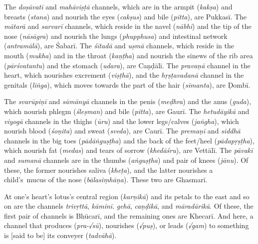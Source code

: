 \documentclass[naipra.tex]{subfiles}
\begin{document}
The \emph{doṣāvatī} and \emph{mahāviṣṭā} channels, which are in the armpit (\emph{kakṣa}) and breasts (\emph{stana}) and nourish the eyes (\emph{cakṣus}) and bile (\emph{pitta}), are Pukkasī.
The \emph{mātarā} and \emph{sarvarī} channels, which reside in the navel (\emph{nābhi}) and the tip of the nose (\emph{nāsāgra}) and nourish the lungs (\emph{phupphusa}) and intestinal network (\emph{antramālā}), are Śabarī.
The \emph{śītadā} and \emph{uṣmā} channels, which reside in the mouth (\emph{mukha}) and in the throat (\emph{kaṇṭha}) and nourish the sinews of the rib area (\emph{pārśvatantu}) and the stomach (\emph{udara}), are Caṇḍālī.
The \emph{pravaṇā} channel in the heart, which nourishes excrement (\emph{viṣṭhā}), and the \emph{hṛṣṭavadanā} channel in the genitals (\emph{liṅga}), which moves towards the part of the hair (\emph{sīmanta}), are Ḍombī.

The \emph{svarūpiṇī} and \emph{sāmānyā} channels in the penis (\emph{meḍhra}) and the anus (\emph{guda}), which nourish phlegm (\emph{śleṣman}) and bile (\emph{pitta}), are Gaurī.
The \emph{hetudāyikā} and \emph{viyogā} channels in the thighs (\emph{ūru}) and the lower legs/calves (\emph{jaṅgha}), which nourish blood (\emph{śoṇita}) and sweat (\emph{sveda}), are Caurī.
The \emph{premaṇī} and \emph{siddhā} channels in the big toes (\emph{pādāṅguṣṭha}) and the back of the feet/heel (\emph{pādapṛṣṭha}), which nourish fat (\emph{medas}) and tears of sorrow (\emph{khedāśru}), are Vettālī.
The \emph{pāvakī} and \emph{sumanā} channels are in the thumbs (\emph{aṅguṣṭha}) and pair of knees (\emph{jānu}).
Of these, the former nourishes saliva (\emph{kheṭa}), and the latter nourishes \crux a child's\crux\ mucus of the nose (\emph{bālasiṃhāṇa}).
These two are Ghasmarī.

At one's heart's lotus's central region (\emph{karṇikā}) and its petals to the east and so on are the channels \emph{trivṛttā}, \emph{kāminī}. \emph{gehā}, \emph{caṇḍikā}, and \emph{māradārikā}.
Of these, the first pair of channels is Bhūcarī, and the remaining ones are Khecarī.
And here, a channel that produces (\emph{pra-√sū}), nourishes (\emph{√puṣ}), or leads (\emph{√gam}) to something is [said to be] its conveyer (\emph{tadvāhā}).
\end{document}
